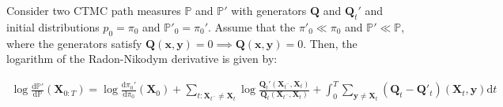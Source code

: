 \documentclass{article}
\begin{document}
\begin{proposition}\label{prop:ctmc-rnd}
    Consider two CTMC path measures $\mathbb{P}$ and $\mathbb{P}'$ with generators $\boldsymbol{Q}$ and $\boldsymbol{Q}_t'$ and initial distributions $p_0=\pi_0$ and $\mathbb{P}'_0=\pi_0'$. Assume that the $\pi'_0\ll\pi_0$ and $\mathbb{P}'\ll \mathbb{P}$, where the generators satisfy $\boldsymbol{Q}(\boldsymbol{x},\boldsymbol{y})=0\implies \boldsymbol{Q}(\boldsymbol{x},\boldsymbol{y})=0$. Then, the logarithm of the Radon-Nikodym derivative is given by:
    \begin{small}
    \begin{align}
        \log \frac{\mathrm{d}\mathbb{P}'}{\mathrm{d}\mathbb{P}}(\boldsymbol{X}_{0:T})=\log \frac{\mathrm{d}\pi_0'}{\mathrm{d}\pi_0}(\boldsymbol{X}_0)+\sum_{t:\boldsymbol{X}_{t^-}\neq \boldsymbol{X}_t}\log \frac{\boldsymbol{Q}_t'(\boldsymbol{X}_{t^-}, \boldsymbol{X}_t)}{\boldsymbol{Q}_t(\boldsymbol{X}_{t^-}, \boldsymbol{X}_t)}+\int_0^T\sum_{\boldsymbol{y}\neq\boldsymbol{X}_t}(\boldsymbol{Q}_t-\boldsymbol{Q}'_t)(\boldsymbol{X}_t,\boldsymbol{y})\mathrm{d}t
    \end{align}
    \end{small}
\end{proposition}
\end{document}
